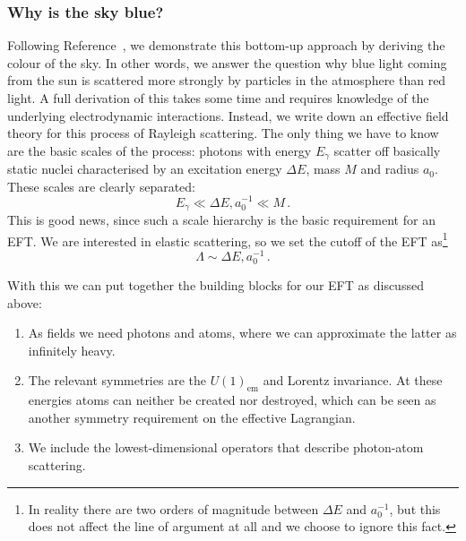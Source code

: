 




\subsubsection{Why is the sky blue?}

Following Reference~\cite{Kaplan:2005es}, we demonstrate this
bottom-up approach by deriving the colour of the sky. In other words,
we answer the question why blue light coming from the sun is scattered
more strongly by particles in the atmosphere than red light.  A full
derivation of this takes some time and requires knowledge of the
underlying electrodynamic interactions. Instead, we write down an
effective field theory for this process of Rayleigh scattering. The
only thing we have to know are the basic scales of the process:
photons with energy $E_\gamma$ scatter off basically static nuclei
characterised by an excitation energy $\Delta E$, mass $M$ and radius
$a_0$. These scales are clearly separated:
%
\begin{equation}
  E_\gamma \ll \Delta E,  a_0^{-1} \ll M \,.
\end{equation}
%
This is good news, since such a scale hierarchy is the basic
requirement for an EFT. We are interested in elastic scattering, so we
set the cutoff of the EFT as\footnote{In reality there are two orders
  of magnitude between $\Delta E$ and $a_0^{-1}$, but this does not
  affect the line of argument at all and we choose to ignore this
  fact.}
\begin{equation}
  \Lambda \sim \Delta E, a_0^{-1} \,.
\end{equation}

With this we can put together the building blocks for our EFT as
discussed above:
%
\begin{enumerate}
\item As fields we need photons and atoms, where we can
  approximate the latter as infinitely heavy.
\item The relevant symmetries are the $U(1)_{\text{em}}$ and Lorentz
  invariance. At these energies atoms can neither be created nor
  destroyed, which can be seen as another symmetry requirement on the
  effective Lagrangian.
\item We include the lowest-dimensional operators that describe
  photon-atom scattering.
\end{enumerate}

